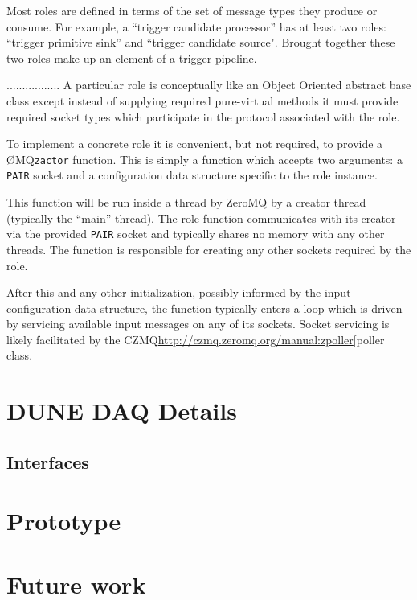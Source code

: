 \documentclass[letterpaper,oneside]{memoir}
\def\pair{\texttt{PAIR}\xspace}
\def\zactor{\texttt{zactor}\xspace}
\def\zmq{\O{}MQ\xspace}
\def\czmq{CZMQ\xspace}
\begin{document}
Most roles are defined in terms of the set of message types they produce or consume. 
For example, a ``trigger candidate processor'' has at least two roles: ``trigger primitive sink'' and ``trigger candidate source". 
Brought together these two roles make up an element of a trigger pipeline.  

.................
A particular role is conceptually like an Object Oriented abstract base class except instead of supplying required pure-virtual methods it must provide required socket types which participate in the protocol associated with the role.

To implement a concrete role it is convenient, but not required, to provide a \zmq \zactor function. 
This is simply a function which accepts two arguments: a \pair socket and a configuration data structure specific to the role instance.

This function will be run inside a thread by ZeroMQ by a creator thread (typically the ``main'' thread). 
The role function communicates with its creator via the provided \pair socket and typically shares no memory with any other threads. 
The function is responsible for creating any other sockets required by the role.

After this and any other initialization, possibly informed by the input configuration data structure, the function typically enters a loop which is driven by servicing available input messages on any of its sockets. 
Socket servicing is likely facilitated by the \czmq \url{http://czmq.zeromq.org/manual:zpoller}{[poller} class.

\chapter{DUNE DAQ Details}

\section{Interfaces}

\chapter{Prototype}

\chapter{Future work}
\end{document}
